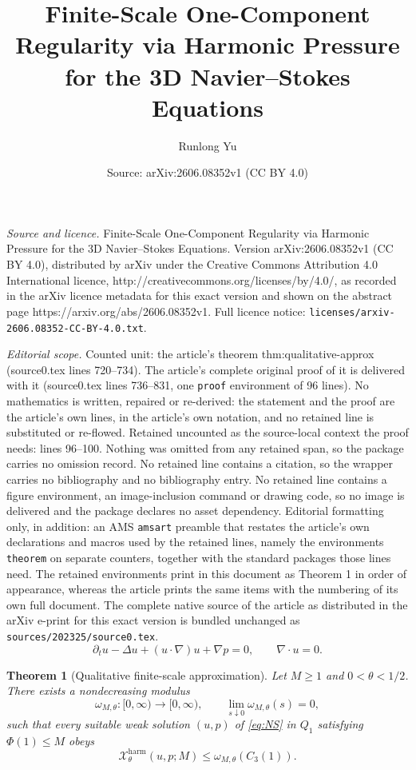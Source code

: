 \documentclass[10pt,a4paper]{amsart}
\title{Finite-Scale One-Component Regularity via Harmonic Pressure for the 3D Navier--Stokes Equations}
\author{Runlong Yu}
\date{Source: arXiv:2606.08352v1 (CC BY 4.0)}
\newtheorem{theorem}{Theorem}
\newcommand{\calX}{\mathcal X}
\newcommand{\harm}{\mathrm{harm}}
\begin{document}
\maketitle

\noindent\emph{Source and licence.} Finite-Scale One-Component Regularity via Harmonic Pressure for the 3D Navier--Stokes Equations. Version arXiv:2606.08352v1 (CC BY 4.0), distributed by arXiv under the Creative Commons Attribution 4.0 International licence, http://creativecommons.org/licenses/by/4.0/, as recorded in the arXiv licence metadata for this exact version and shown on the abstract page https://arxiv.org/abs/2606.08352v1. Full licence notice: \texttt{licenses/arxiv-2606.08352-CC-BY-4.0.txt}.\par\smallskip

\noindent\textit{Editorial scope.} Counted unit: the article's theorem thm:qualitative-approx (source0.tex lines 720--734). The article's complete original proof of it is delivered with it (source0.tex lines 736--831, one \texttt{proof} environment of 96 lines). No mathematics is written, repaired or re-derived: the statement and the proof are the article's own lines, in the article's own notation, and no retained line is substituted or re-flowed.  Retained uncounted as the source-local context the proof needs: lines 96--100.  Nothing was omitted from any retained span, so the package carries no omission record.  No retained line contains a citation, so the wrapper carries no bibliography and no bibliography entry.  No retained line contains a figure environment, an image-inclusion command or drawing code, so no image is delivered and the package declares no asset dependency.  Editorial formatting only, in addition: an AMS \texttt{amsart} preamble that restates the article's own declarations and macros used by the retained lines, namely the environments \texttt{theorem} on separate counters, together with the standard packages those lines need.  The retained environments print in this document as Theorem 1 in order of appearance, whereas the article prints the same items with the numbering of its own full document.  The complete native source of the article as distributed in the arXiv e-print for this exact version is bundled unchanged as \texttt{sources/202325/source0.tex}.
\begin{equation}
        \partial_tu-\Delta u+(u\cdot\nabla)u+\nabla p=0,
        \qquad \nabla\cdot u=0.
        \label{eq:NS}
\end{equation}

\begin{theorem}[Qualitative finite-scale approximation]
\label{thm:qualitative-approx}
Let \(M\ge1\) and \(0<\theta<1/2\).  There exists a nondecreasing modulus
\[
        \omega_{M,\theta}:[0,\infty)\to[0,\infty),
        \qquad
        \lim_{s\downarrow0}\omega_{M,\theta}(s)=0,
\]
such that every suitable weak solution \((u,p)\) of \eqref{eq:NS} in \(Q_1\) satisfying \(\Phi(1)\le M\) obeys
\begin{equation}
        \calX^{\harm}_\theta(u,p;M)
        \le \omega_{M,\theta}(C_3(1)).
        \label{eq:qualitative-approx}
\end{equation}
\end{theorem}
\end{document}
